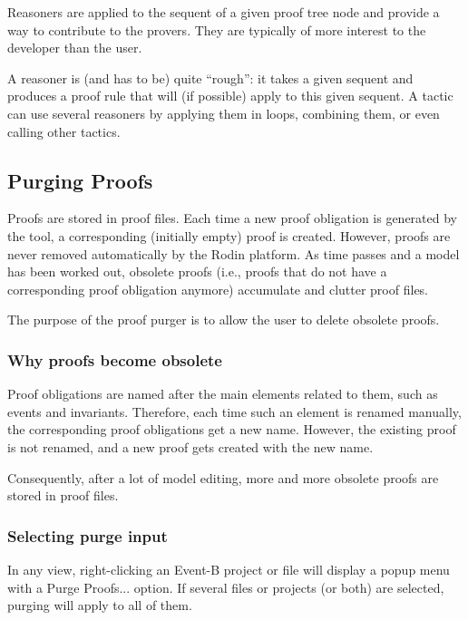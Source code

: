 Reasoners are applied to the sequent of a given proof tree node and provide a way to contribute to the provers.  They are typically of more interest to the developer than the user. 

A reasoner is (and has to be) quite ``rough'': it takes a given sequent and produces a proof rule that will (if possible) apply to this given sequent. A tactic can use several reasoners by applying them in loops, combining them, or even calling other tactics.

\subsection{Purging Proofs}
\label{purging_proofs}

Proofs are stored in proof files. Each time a new proof obligation is generated by the tool, a corresponding (initially empty) proof is created. However, proofs are never removed automatically by the Rodin platform. As time passes and a model has been worked out, obsolete proofs (i.e., proofs that do not have a corresponding proof obligation anymore) accumulate and clutter proof files.

The purpose of the proof purger is to allow the user to delete obsolete proofs. 

\subsubsection{Why proofs become obsolete}
\label{obsolete_proof}

Proof obligations are named after the main elements related to them, such as events and invariants. Therefore, each time such an element is renamed manually, the corresponding proof obligations get a new name. However, the existing proof is not renamed, and a new proof gets created with the new name.

Consequently, after a lot of model editing, more and more obsolete proofs are stored in proof files.

\subsubsection{Selecting purge input}

In any view, right-clicking an Event-B project or file will display a popup menu with a \textsf{Purge Proofs...} option. If several files or projects (or both) are selected, purging will apply to all of them.

